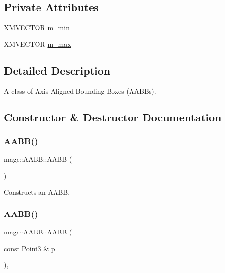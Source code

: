 \subsection*{Private Attributes}
\begin{DoxyCompactItemize}
\item 
X\+M\+V\+E\+C\+T\+OR \mbox{\hyperlink{classmage_1_1_a_a_b_b_a9aa94271f73b8199a0431b0ae2abb35a}{m\+\_\+min}}
\item 
X\+M\+V\+E\+C\+T\+OR \mbox{\hyperlink{classmage_1_1_a_a_b_b_a9f850f5f39e4b2192dfac97c508ef052}{m\+\_\+max}}
\end{DoxyCompactItemize}


\subsection{Detailed Description}
A class of Axis-\/\+Aligned Bounding Boxes (A\+A\+B\+Bs). 

\subsection{Constructor \& Destructor Documentation}
\mbox{\label{classmage_1_1_a_a_b_b_a4bf8c44135580cda2ab0c78da14c634e}} 
\subsubsection{\texorpdfstring{A\+A\+B\+B()}{AABB()}\hspace{0.1cm}{\footnotesize\ttfamily [1/8]}}
{\footnotesize\ttfamily mage\+::\+A\+A\+B\+B\+::\+A\+A\+BB (\begin{DoxyParamCaption}{ }\end{DoxyParamCaption})\hspace{0.3cm}{\ttfamily [noexcept]}}

Constructs an \mbox{\hyperlink{classmage_1_1_a_a_b_b}{A\+A\+BB}}. \mbox{\label{classmage_1_1_a_a_b_b_a97a4a755cb0b9c017fd5a311576a5c00}} 
\subsubsection{\texorpdfstring{A\+A\+B\+B()}{AABB()}\hspace{0.1cm}{\footnotesize\ttfamily [2/8]}}
{\footnotesize\ttfamily mage\+::\+A\+A\+B\+B\+::\+A\+A\+BB (\begin{DoxyParamCaption}\item[{const \mbox{\hyperlink{structmage_1_1_point3}{Point3}} \&}]{p }\end{DoxyParamCaption})\hspace{0.3cm}{\ttfamily [explicit]}, {\ttfamily [noexcept]}}

